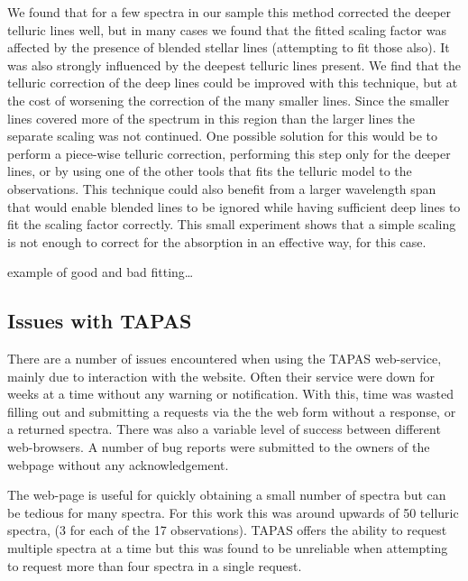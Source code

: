 We found that for a few spectra in our sample this method corrected the deeper telluric lines well, but in many cases we found that the fitted scaling factor was affected by the presence of blended stellar lines (attempting to fit those also).
It was also strongly influenced by the deepest   telluric lines present.
We find that the telluric correction of the deep  lines could be improved with this technique, but at the cost of worsening the correction of the many smaller  lines.
Since the smaller  lines covered more of the spectrum in this region than the larger lines the separate  scaling was not continued.
One possible solution for this would be to perform a piece-wise telluric correction, performing this step only for the deeper  lines, or by using one of the other tools that fits the telluric model to the observations.
This technique could also benefit from a larger wavelength span that would enable blended lines to be ignored while having sufficient deep  lines to fit the scaling factor correctly.
This small experiment shows that a simple scaling is not enough to correct for the absorption in an effective way, for this case.


 example of good and bad fitting\ldots



\subsection{Issues with {TAPAS}}
There are a number of issues encountered when using the {TAPAS} web-service, mainly due to interaction with the website.
Often their service were down for weeks at a time without any warning or notification.
With this, time was wasted filling out and submitting a requests via the the web form without a response, or a returned spectra.
There was also a variable level of success between different web-browsers.
A number of bug reports were submitted to the owners of the webpage without any acknowledgement.

The web-page is useful for quickly obtaining a small number of spectra but can be tedious for many spectra.
For this work this was around upwards of 50 telluric spectra, (3 for each of the 17 observations). TAPAS offers the ability to request multiple spectra at a time but this was found to be unreliable when attempting to request more than four spectra in a single request.

